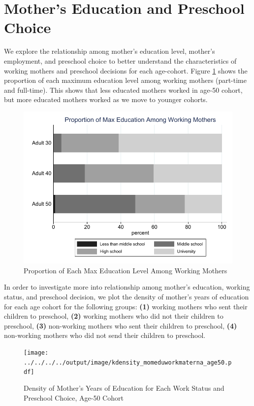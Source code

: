 \section{Mother's Education and Preschool Choice}
We explore the relationship among mother's education level, mother's employment, and preschool choice to better understand the characteristics of working mothers and preschool decisions for each age-cohort. Figure \ref{fig:m-maxedu-work} shows the proportion of each maximum education level among working mothers (part-time and full-time). This shows that less educated mothers worked in age-50 cohort, but more educated mothers worked as we move to younger cohorts. 

\begin{figure}[H] \caption{Proportion of Each Max Education Level Among Working Mothers} \label{fig:m-maxedu-work}
\centering
\includegraphics[scale=0.9]{../../../../output/image/bar_momeduwork.pdf}
\end{figure}

In order to investigate more into relationship among mother's education, working status, and preschool decision, we plot the density of mother's years of education for each age cohort for the following groups: \textbf{(1)} working mothers who sent their children to preschool, \textbf{(2)} working mothers who did not their children to preschool, \textbf{(3)} non-working mothers who sent their children to preschool, \textbf{(4)} non-working mothers who did not send their children to preschool.

\begin{figure}[H] \caption{Density of Mother's Years of Education for Each Work Status and Preschool Choice, Age-50 Cohort} \label{fig:density-medu-age50}
\centering
\texttt{[image: ../../../../output/image/kdensity\_momeduworkmaterna\_age50.pdf]}
\end{figure}

